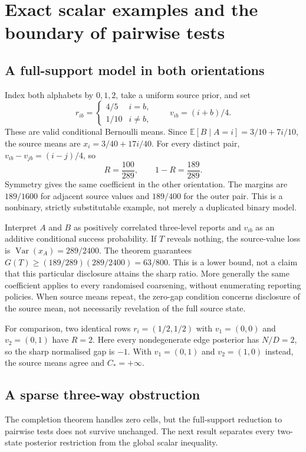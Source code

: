 \documentclass[11pt,a4paper]{article}
\newcommand{\E}{\mathbb E}
\newcommand{\Var}{\operatorname{Var}}
\begin{document}
\section{Exact scalar examples and the boundary of pairwise tests}
\subsection{A full-support model in both orientations}\label{sec:full-example}
Index both alphabets by $0,1,2$, take a uniform source prior, and set
\[
 r_{ib}=\begin{cases}4/5&i=b,\\1/10&i\ne b,\end{cases}
 \qquad v_{ib}=(i+b)/4.
\]
These are valid conditional Bernoulli means. Since $\E[B\mid A=i]=3/10+7i/10$, the source means are $x_i=3/40+17i/40$. For every distinct pair, $v_{ib}-v_{jb}=(i-j)/4$, so
\[
 R=\frac{100}{289},\qquad 1-R=\frac{189}{289}.
\]
Symmetry gives the same coefficient in the other orientation. The margins are $189/1600$ for adjacent source values and $189/400$ for the outer pair. This is a nonbinary, strictly substitutable example, not merely a duplicated binary model.

Interpret $A$ and $B$ as positively correlated three-level reports and $v_{ib}$ as an additive conditional success probability. If $T$ reveals nothing, the source-value loss is $\Var(x_A)=289/2400$. The theorem guarantees $G(T)\geq(189/289)(289/2400)=63/800$. This is a lower bound, not a claim that this particular disclosure attains the sharp ratio. More generally the same coefficient applies to every randomised coarsening, without enumerating reporting policies. When source means repeat, the zero-gap condition concerns disclosure of the source mean, not necessarily revelation of the full source state.

For comparison, two identical rows $r_i=(1/2,1/2)$ with $v_1=(0,0)$ and $v_2=(0,1)$ have $R=2$. Here every nondegenerate edge posterior has $N/D=2$, so the sharp normalised gap is $-1$. With $v_1=(0,1)$ and $v_2=(1,0)$ instead, the source means agree and $C_*=+\infty$.

\subsection{A sparse three-way obstruction}
The completion theorem handles zero cells, but the full-support reduction to pairwise tests does not survive unchanged. The next result separates every two-state posterior restriction from the global scalar inequality.
\end{document}
